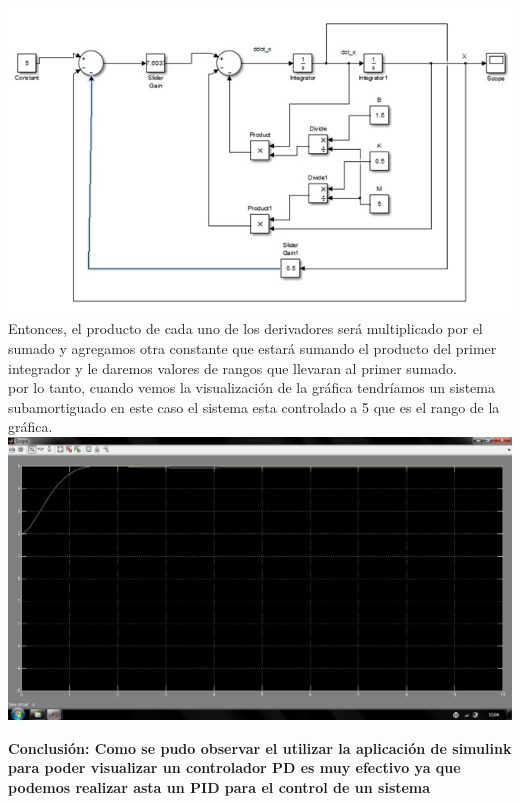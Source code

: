 \documentclass[12pt,letterpaper]{article}
\begin{document}
\begin{flushleft}
\begin{flushleft}
\end{flushleft}
\begin{flushleft}
\includegraphics[scale=1]{simulink2-2.jpg}\\  
Entonces, el producto de cada uno de  los derivadores ser\'a multiplicado por el sumado y agregamos otra constante que estar\'a sumando el producto del primer integrador y le daremos valores de rangos que llevaran al primer sumado. \\
por lo tanto, cuando vemos la visualizaci\'on de la gr\'afica tendríamos un sistema subamortiguado en este caso  el sistema esta controlado a 5 que es el rango de la gr\'afica.\\
\includegraphics[scale=.5]{captura_simulink.jpg} 
  
\end{flushleft}
\end{flushleft} 
\textbf{Conclusi\'on: Como se pudo observar el utilizar la aplicaci\'on de simulink  para poder visualizar   un controlador PD  es muy efectivo ya que podemos realizar asta un PID para el control de un sistema   } 
\end{document}
